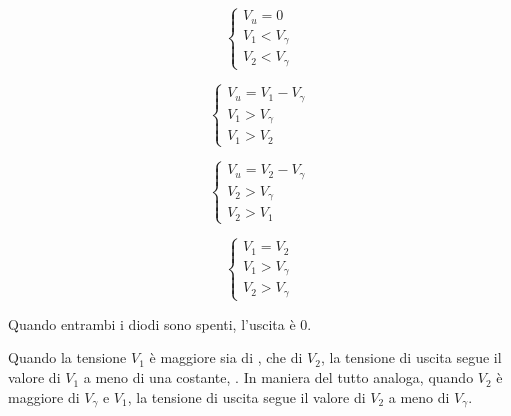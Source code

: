 \documentclass[../elettronica]{subfiles}
\begin{document}
\begin{minipage}[b]{.45\textwidth}
    \begin{tcolorbox}[title=D1 e D2 OFF]
        \[\begin{cases}
            V_u = 0
            \\
            V_{1} < V_\gamma
            \\
            V_{2} < V_\gamma
        \end{cases}\]
    \end{tcolorbox}
\end{minipage}
\begin{minipage}[b]{.45\textwidth}
    \begin{tcolorbox}[title=D1 ON e D2 OFF]
        \[\begin{cases}
            V_u = V_{1} - V_\gamma
            \\
            V_{1} > V_\gamma
            \\
            V_{1} > V_{2}
        \end{cases}\]
    \end{tcolorbox}
\end{minipage}

\begin{minipage}[b]{.45\textwidth}
    \begin{tcolorbox}[title=D1 OFF e D2 ON]
        \[\begin{cases}
            V_u = V_{2} - V_\gamma
            \\
            V_{2} > V_\gamma
            \\
            V_{2} > V_{1}
        \end{cases}\]
    \end{tcolorbox}
\end{minipage}
\begin{minipage}[b]{.45\textwidth}
    \begin{tcolorbox}[title=D1 ON e D2 ON]
        \[\begin{cases}
            V_{1} = V_{2}
            \\
            V_{1} > V_\gamma
            \\
            V_{2} > V_\gamma
        \end{cases}\]
    \end{tcolorbox}
\end{minipage}

Quando entrambi i diodi sono spenti, l'uscita è 0.

Quando la tensione $V_{1}$ è maggiore sia di \vgg, che di $V_{2}$, la tensione di uscita segue il
valore di $V_{1}$ a meno di una costante, \vgg.
In maniera del tutto analoga, quando $V_{2}$ è maggiore di $V_\gamma$ e $V_{1}$, la tensione di uscita
segue il valore di $V_{2}$ a meno di $V_\gamma$.
\end{document}
